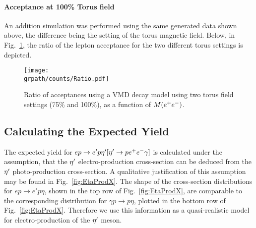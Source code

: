 \paragraph{Acceptance at 100\% Torus field}
An addition simulation was performed using the same generated data shown above, the difference being the setting of the torus magnetic field. Below, in Fig.~\ref{fig:ratio}, the ratio of the lepton acceptance for the two different torus settings is depicted.
\begin{figure}[h!]\begin{center}
		\texttt{[image: \\grpath/counts/Ratio.pdf]}
		\caption[Acceptance, as a function of $M(\epem)$]{\label{fig:ratio}{Ratio of acceptances using a VMD decay model using two torus field settings (75\% and 100\%), as a function of $M(\epem)$. }}
	\end{center}\end{figure}
	\FloatBarrier
\subsection{Calculating the Expected Yield}\label{sec:yield}

The expected yield for $ep\to e'p \eta^{\prime} [\eta^{\prime}\rightarrow p e^+e^- \gamma ]$ is calculated under the assumption, that the $\eta^{\prime}$ electro-production cross-section can be deduced from the $\eta^{\prime}$ photo-production cross-section. A qualitative justification of this assumption may be found in Fig.~\ref{fig:EtaProdX}. The shape of the cross-section distributions for $ep\rightarrow e'p\eta$, shown in the top row of Fig.~\ref{fig:EtaProdX}, are comparable to the corresponding distribution for $\gamma p\rightarrow p\eta$, plotted in the bottom row of Fig.~\ref{fig:EtaProdX}. Therefore we use this information as a quasi-realistic model for electro-production of the $\eta^{\prime}$ meson.

